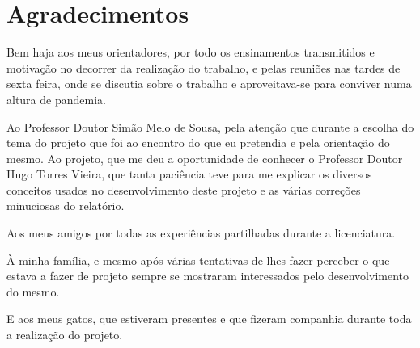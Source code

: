 \chapter*{Agradecimentos}
\label{chap:ack}

Bem haja aos meus orientadores, por todo os ensinamentos transmitidos e motivação no decorrer da realização do trabalho, e pelas reuniões nas tardes de sexta feira,
onde se discutia sobre o trabalho e aproveitava-se para conviver numa altura de pandemia.

Ao Professor Doutor Simão Melo de Sousa, pela atenção que durante a escolha do tema do projeto que foi ao encontro do que eu pretendia e pela orientação do mesmo.
Ao projeto, que me deu a oportunidade de conhecer o Professor Doutor Hugo Torres Vieira, que tanta paciência teve para me explicar os diversos conceitos usados no desenvolvimento deste 
projeto e as várias correções minuciosas do relatório.

Aos meus amigos por todas as experiências partilhadas durante a licenciatura.

À minha família, e mesmo após várias tentativas de lhes fazer perceber o que estava a fazer de projeto sempre se mostraram interessados pelo desenvolvimento do mesmo.

E aos meus gatos, que estiveram presentes e que fizeram companhia durante toda a realização do projeto.

